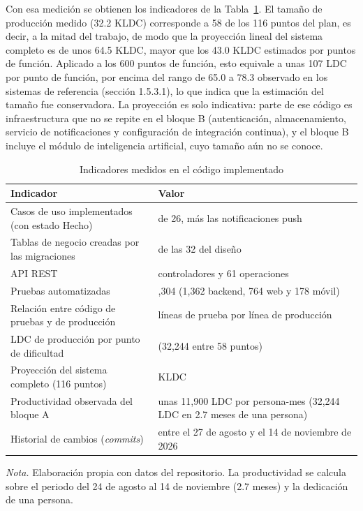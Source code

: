 Con esa medición se obtienen los indicadores de la Tabla~\ref{tab:indicadores_reales}. El tamaño de producción medido (32.2 KLDC) corresponde a 58 de los 116 puntos del plan, es decir, a la mitad del trabajo, de modo que la proyección lineal del sistema completo es de unos 64.5 KLDC, mayor que los 43.0 KLDC estimados por puntos de función. Aplicado a los 600 puntos de función, esto equivale a unas 107 LDC por punto de función, por encima del rango de 65.0 a 78.3 observado en los sistemas de referencia (sección 1.5.3.1), lo que indica que la estimación del tamaño fue conservadora. La proyección es solo indicativa: parte de ese código es infraestructura que no se repite en el bloque B (autenticación, almacenamiento, servicio de notificaciones y configuración de integración continua), y el bloque B incluye el módulo de inteligencia artificial, cuyo tamaño aún no se conoce.

\begin{table}[H]
\caption{Indicadores medidos en el código implementado}
\label{tab:indicadores_reales}
\begin{threeparttable}
\begin{tabular}{>{\raggedright\arraybackslash}p{7.2cm} >{\raggedright\arraybackslash}p{5.8cm}}
\toprule
Indicador & Valor \\
\midrule
Casos de uso implementados (con estado Hecho) & 13 de 26, más las notificaciones push \\
Tablas de negocio creadas por las migraciones & 23 de las 32 del diseño \\
API REST & 22 controladores y 61 operaciones \\
Pruebas automatizadas & 2,304 (1,362 backend, 764 web y 178 móvil) \\
Relación entre código de pruebas y de producción & 1.1 líneas de prueba por línea de producción \\
LDC de producción por punto de dificultad & 556 (32,244 entre 58 puntos) \\
Proyección del sistema completo (116 puntos) & 64.5 KLDC \\
Productividad observada del bloque A & unas 11,900 LDC por persona-mes (32,244 LDC en 2.7 meses de una persona) \\
Historial de cambios (\textit{commits}) & 219 entre el 27 de agosto y el 14 de noviembre de 2026 \\
\bottomrule
\end{tabular}
\begin{tablenotes}
\item \textit{Nota.} Elaboración propia con datos del repositorio. La productividad se calcula sobre el periodo del 24 de agosto al 14 de noviembre (2.7 meses) y la dedicación de una persona.
\end{tablenotes}
\end{threeparttable}
\end{table}

